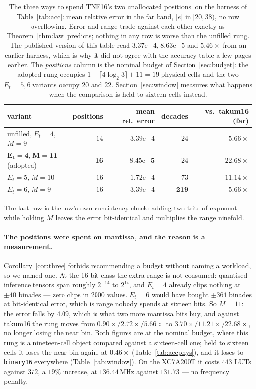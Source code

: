 \documentclass[11pt]{article}
\theoremstyle{definition}
\begin{document}
\begin{table}[t]\centering
\caption{The three ways to spend TNF16's two unallocated positions, on the
harness of Table~\ref{tab:acc}: mean relative error in the far band, $|e|$ in
$[20,38)$, no row overflowing. Error and range trade against each other exactly
as Theorem~\ref{thm:law} predicts; nothing in any row is worse than the unfilled
rung. The published version of this table read $3.37\mathrm{e}{-4}$,
$8.63\mathrm{e}{-5}$ and $5.46\times$ from an earlier harness, which is why it did
not agree with the accuracy table a few pages earlier. The \emph{positions} column
is the nominal budget of Section~\ref{sec:budget}: the adopted rung occupies
$1+\lceil 4\log_2 3\rceil+11=19$ physical cells and the two $E_t{=}5,6$ variants
occupy $20$ and $22$. Section~\ref{sec:window} measures what happens when the
comparison is held to sixteen cells instead.}
\label{tab:tnf16-fill}
\begin{tabular}{lrrrr}
\toprule
variant & positions & mean rel.\ error & decades & vs.\ takum16 (far) \\
\midrule
unfilled, $E_t{=}4$, $M{=}9$  & $14$ & $3.39\mathrm{e}{-4}$ & $24$  & $5.66\times$ \\
$\mathbf{E_t{=}4}$, $\mathbf{M{=}11}$ (adopted) & $\mathbf{16}$ & $\mathbf{8.45\mathrm{e}{-5}}$ & $24$ & $\mathbf{22.68\times}$ \\
$E_t{=}5$, $M{=}10$           & $16$ & $1.72\mathrm{e}{-4}$ & $73$  & $11.14\times$ \\
$E_t{=}6$, $M{=}9$            & $16$ & $3.39\mathrm{e}{-4}$ & $\mathbf{219}$ & $5.66\times$ \\
\bottomrule
\end{tabular}
\end{table}

The last row is the law's own consistency check: adding two trits of exponent
while holding $M$ leaves the error bit-identical and multiplies the range
ninefold.

\paragraph{The positions were spent on mantissa, and the reason is a measurement.}
Corollary~\ref{cor:three} forbids recommending a budget without naming a workload,
so we named one. At the 16-bit class the extra range is not consumed:
quantised-inference tensors span roughly $2^{-14}$ to $2^{14}$, and $E_t = 4$
already clips nothing at $\pm 40$ binades --- zero clips in 2000 values. $E_t = 6$
would have bought $\pm 364$ binades at bit-identical error, which is range nobody
spends at sixteen bits. So $M = 11$: the error falls by $4.09$, which is what two
more mantissa bits buy, and against takum16 the rung moves from
$0.90\times / 2.72\times / 5.66\times$ to $3.70\times / 11.21\times / 22.68\times$,
no longer losing the near bin. Both figures are at the nominal budget, where this
rung is a nineteen-cell object compared against a sixteen-cell one; held to
sixteen cells it loses the near bin again, at $0.46\times$
(Table~\ref{tab:accphys}), and it loses to \texttt{binary16} everywhere
(Table~\ref{tab:window}). On the XC7A200T it costs $443$ LUTs against $372$,
a $19\%$ increase, at $136.44$\,MHz against $131.73$ --- no frequency penalty.
\end{document}
